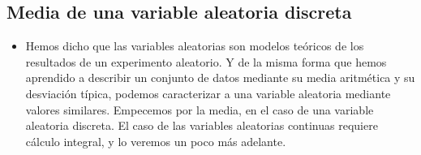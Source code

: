\subsection{Media de una variable aleatoria discreta}

\begin{itemize}

    \item Hemos dicho que las variables aleatorias son modelos teóricos de los resultados de un experimento aleatorio. Y de la misma forma que hemos aprendido a describir un conjunto de datos mediante su media aritmética y su desviación típica, podemos caracterizar a una variable aleatoria mediante valores similares. Empecemos por la media, en el caso de una variable aleatoria discreta. El caso de las variables aleatorias continuas requiere cálculo integral, y lo veremos un poco más adelante.


\end{itemize}
